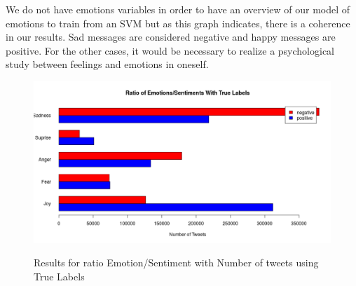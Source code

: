 \documentclass{acmtog} %
\begin{document}
\begin{table}[H]
\label{tab:cross_tab_TextBLOB}
\end{table}


We do not have emotions variables in order to have an overview of our model of emotions to train from an SVM but as this graph indicates, there is a coherence in our results. Sad messages are considered negative and happy messages are positive. For the other cases, it would be necessary to realize a psychological study between feelings and emotions in oneself.

\begin{figure}[h!]
{\includegraphics[width=\linewidth]{ratio-true-labels.png}}
\caption{Results for ratio Emotion/Sentiment with Number of tweets using True Labels}
  \label{fig:contradiction_barplot}
\end{figure}

\begin{table}[H]
\label{tab:cross_tab_TrueLabels}
\end{table}
\end{document}
